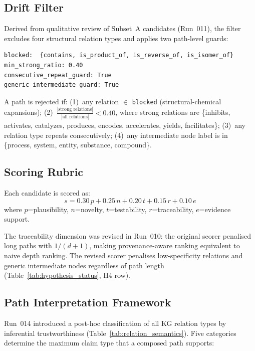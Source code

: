 \subsection{Drift Filter}
\label{sec:filter}

Derived from qualitative review of Subset~A candidates (Run~011),
the filter excludes four structural relation types and applies two path-level guards:

\begin{verbatim}
blocked:  {contains, is_product_of, is_reverse_of, is_isomer_of}
min_strong_ratio: 0.40
consecutive_repeat_guard: True
generic_intermediate_guard: True
\end{verbatim}

\noindent A path is rejected if:
(1)~any relation $\in$ \texttt{blocked} (structural-chemical expansions);
(2)~$\frac{|\text{strong relations}|}{|\text{all relations}|} < 0.40$, where
strong relations are \{inhibits, activates, catalyzes, produces, encodes,
accelerates, yields, facilitates\};
(3)~any relation type repeats consecutively;
(4)~any intermediate node label is in \{process, system, entity, substance, compound\}.

\subsection{Scoring Rubric}
\label{sec:rubric}

Each candidate is scored as:
\begin{equation}
  s = 0.30\,p + 0.25\,n + 0.20\,t + 0.15\,r + 0.10\,e
  \label{eq:score}
\end{equation}
where $p$=plausibility, $n$=novelty, $t$=testability, $r$=traceability, $e$=evidence support.

The traceability dimension was revised in Run~010: the original scorer penalised
long paths with $1/(d+1)$, making provenance-aware ranking equivalent to naive
depth ranking.
The revised scorer penalises low-specificity relations and generic intermediate
nodes regardless of path length (Table~\ref{tab:hypothesis_status}, H4 row).

\subsection{Path Interpretation Framework}
\label{sec:interpretation}

Run~014 introduced a post-hoc classification of all KG relation types by
inferential trustworthiness (Table~\ref{tab:relation_semantics}).
Five categories determine the maximum claim type that a composed path supports:

